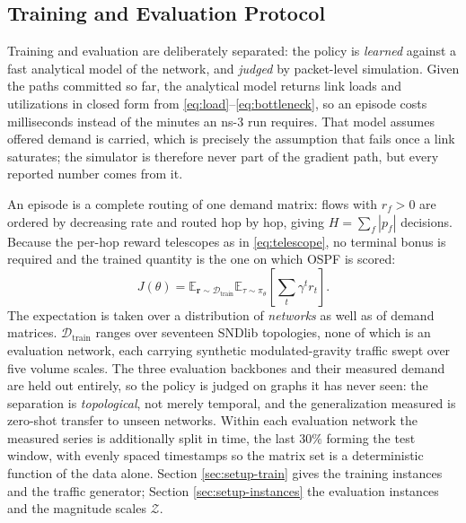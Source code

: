 \subsection{Training and Evaluation Protocol}
Training and evaluation are deliberately separated: the policy is \emph{learned} against a fast
analytical model of the network, and \emph{judged} by packet-level simulation. Given the paths
committed so far, the analytical model returns link loads and utilizations in closed form from
\eqref{eq:load}--\eqref{eq:bottleneck}, so an episode
costs milliseconds instead of the minutes an \mbox{ns-3} run requires. That model assumes offered
demand is carried, which is precisely the assumption that fails once a link saturates; the
simulator is therefore never part of the gradient path, but every reported number comes from it.

An episode is a complete routing of one demand matrix: flows with $r_f > 0$ are ordered by
decreasing rate and routed hop by hop, giving $H = \sum_f |p_f|$ decisions. Because the per-hop
reward telescopes as in \eqref{eq:telescope}, no terminal bonus is
required and the trained quantity is the one on which OSPF is scored:
\begin{equation}\label{eq:objective-rl}
J(\theta) = \mathbb{E}_{\mathbf{r} \sim \mathcal{D}_{\mathrm{train}}}
\mathbb{E}_{\tau \sim \pi_\theta}\!\left[\sum_{t} \gamma^{t} r_t\right].
\end{equation}
The expectation is taken over a distribution of \emph{networks} as well as of demand
matrices. $\mathcal{D}_{\mathrm{train}}$ ranges over seventeen SNDlib topologies, none of
which is an evaluation network, each carrying synthetic modulated-gravity traffic swept
over five volume scales. The three evaluation backbones and their measured demand are held
out entirely, so the policy is judged on graphs it has never seen: the separation is
\emph{topological}, not merely temporal, and the generalization measured is zero-shot
transfer to unseen networks. Within each evaluation network the measured series is
additionally split in time, the last $30\%$ forming the test window, with evenly spaced
timestamps so the matrix set is a deterministic function of the data alone. Section
\ref{sec:setup-train} gives the training instances and the traffic generator; Section
\ref{sec:setup-instances} the evaluation instances and the magnitude scales
$\mathcal{Z}$.

